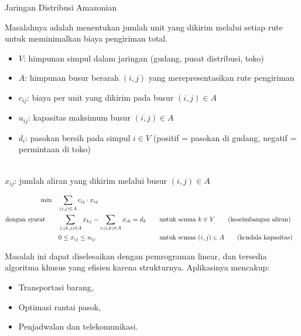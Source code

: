 \begin{example}{Jaringan Distribusi Amazonian}{}
\begin{center}
\par{}\label{fig:modeling-sums-continued-tikz03}%

\end{center}

\noindent Masalahnya adalah menentukan jumlah unit yang dikirim melalui setiap rute untuk meminimalkan biaya pengiriman total.

\smallskip {}
\begin{itemize}
\item \( V \): himpunan simpul dalam jaringan (gudang, pusat distribusi, toko)
\item \( A \): himpunan busur berarah \( (i,j) \) yang merepresentasikan rute pengiriman
\end{itemize}

\smallskip {}
\begin{itemize}
\item \( c_{ij} \): biaya per unit yang dikirim pada busur \( (i, j) \in A \)
\item \( u_{ij} \): kapasitas maksimum busur \( (i, j) \in A \)
\item \( d_i \): pasokan bersih pada simpul \( i \in V \) (positif = pasokan di gudang, negatif = permintaan di toko)
\end{itemize}

\smallskip {} \\
\( x_{ij} \): jumlah aliran yang dikirim melalui busur \( (i, j) \in A \)

\smallskip {}
\begin{align*}
\min \quad & \sum_{(i,j) \in A} c_{ij} \cdot x_{ij} \\
\mbox{dengan syarat}\quad \quad
& \sum_{j : (k,j) \in A} x_{kj} - \sum_{i : (i,k) \in A} x_{ik} = d_k &&\quad \mbox{untuk semua } k \in V   \tag{keseimbangan aliran} \\
& 0 \leq x_{ij} \leq u_{ij} &&\quad \mbox{untuk semua } (i,j) \in A   \tag{kendala kapasitas}
\end{align*}

\noindent Masalah ini dapat diselesaikan dengan pemrograman linear, dan tersedia algoritma khusus yang efisien karena strukturnya. Aplikasinya mencakup:
\begin{itemize}
    \item Transportasi barang,
    \item Optimasi rantai pasok,
    \item Penjadwalan dan telekomunikasi.
\end{itemize}
\end{example}

